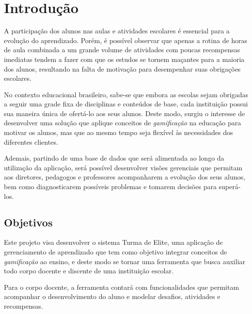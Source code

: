 \documentclass[
    12pt,               %
    openright,          %
    oneside,
    a4paper,            %
    paginasA3,  %
    english,            %
    brazil              %
    ]{ifsp-spo-inf-ctds} %
\begin{document}
\tableofcontents*


\textual

\chapter[Introdução]{Introdução}
A participação dos alunos nas aulas e atividades escolares é essencial para a evolução do aprendizado. Porém, é possível observar que apenas a rotina de horas de aula combinada a um grande volume de atividades com poucas recompensas imediatas tendem a fazer com que os estudos se tornem maçantes para a maioria dos alunos, resultando na falta de motivação para desempenhar suas obrigações escolares.


No contexto educacional brasileiro, sabe-se que embora as escolas sejam obrigadas a seguir uma grade fixa de disciplinas e conteúdos de base, cada instituição possui sua maneira única de ofertá-lo aos seus alunos. Deste modo, surgiu o interesse de desenvolver uma solução que aplique conceitos de \textit{gamificação} na educação para motivar os alunos, mas que ao mesmo tempo seja flexível às necessidades dos diferentes clientes. 


Ademais, partindo de uma base de dados que será alimentada ao longo da utilização da aplicação, será possível desenvolver visões gerenciais que permitam aos diretores, pedagogos e professores acompanharem a evolução dos seus alunos, bem como diagnosticarem possíveis problemas e tomarem decisões para superá-los.

\section{Objetivos}
Este projeto visa desenvolver o sistema Turma de Elite, uma aplicação de gerenciamento de aprendizado que tem como objetivo integrar conceitos de \textit{gamificação} ao ensino, e deste modo se tornar uma ferramenta que busca auxiliar todo corpo docente e discente de uma instituição escolar.


Para o corpo docente, a ferramenta contará com funcionalidades que permitam acompanhar o desenvolvimento do aluno e modelar desafios, atividades e recompensas.
\end{document}
